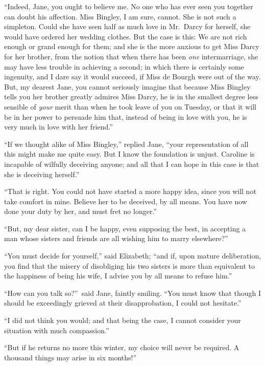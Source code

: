 \documentclass[12pt,english]{book}
\begin{document}
{}``Indeed, Jane, you ought to believe me. No one who has ever seen
you together can doubt his affection. Miss Bingley, I am sure, cannot.
She is not such a simpleton. Could she have seen half as much love
in Mr.\ Darcy for herself, she would have ordered her wedding clothes.
But the case is this: We are not rich enough or grand enough for them;
and she is the more anxious to get Miss Darcy for her brother, from
the notion that when there has been \textit{one} intermarriage, she
may have less trouble in achieving a second; in which there is certainly
some ingenuity, and I dare say it would succeed, if Miss de Bourgh
were out of the way. But, my dearest Jane, you cannot seriously imagine
that because Miss Bingley tells you her brother greatly admires Miss
Darcy, he is in the smallest degree less sensible of \textit{your}
merit than when he took leave of you on Tuesday, or that it will be
in her power to persuade him that, instead of being in love with you,
he is very much in love with her friend.''

{}``If we thought alike of Miss Bingley,'' replied Jane, {}``your
representation of all this might make me quite easy. But I know the
foundation is unjust. Caroline is incapable of wilfully deceiving
anyone; and all that I can hope in this case is that she is deceiving
herself.''

{}``That is right. You could not have started a more happy idea,
since you will not take comfort in mine. Believe her to be deceived,
by all means. You have now done your duty by her, and must fret no
longer.''

{}``But, my dear sister, can I be happy, even supposing the best,
in accepting a man whose sisters and friends are all wishing him to
marry elsewhere?''\ 

{}``You must decide for yourself,'' said Elizabeth; {}``and if,
upon mature deliberation, you find that the misery of disobliging
his two sisters is more than equivalent to the happiness of being
his wife, I advise you by all means to refuse him.''

{}``How can you talk so?''\ said Jane, faintly smiling. {}``You
must know that though I should be exceedingly grieved at their disapprobation,
I could not hesitate.''

{}``I did not think you would; and that being the case, I cannot
consider your situation with much compassion.''

{}``But if he returns no more this winter, my choice will never be
required. A thousand things may arise in six months!''\ 
\end{document}
